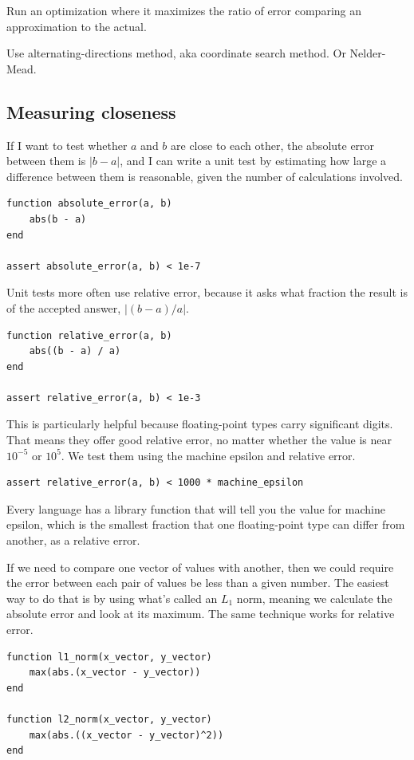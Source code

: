 \documentclass[fleqn,10pt]{olplainarticle}
\begin{document}
Run an optimization where it maximizes the ratio of error comparing an approximation to the actual.

Use alternating-directions method, aka coordinate search method. Or Nelder-Mead.

\subsection{Measuring closeness}

If I want to test whether $a$ and $b$ are close to each other,
the absolute error between them is $|b-a|$, and I can write a unit
test by estimating how large a difference between them is reasonable,
given the number of calculations involved.
\begin{lstlisting}
function absolute_error(a, b)
    abs(b - a)
end

assert absolute_error(a, b) < 1e-7
\end{lstlisting}
Unit tests more often use relative error, because it asks what
fraction the result is of the accepted answer, $|(b - a) / a|$.
\begin{lstlisting}
function relative_error(a, b)
    abs((b - a) / a)
end

assert relative_error(a, b) < 1e-3
\end{lstlisting}
This is particularly helpful because floating-point types carry
significant digits. That means they offer good relative error,
no matter whether the value is near $10^{-5}$ or $10^5$. We test
them using the machine epsilon and relative error.
\begin{lstlisting}
assert relative_error(a, b) < 1000 * machine_epsilon
\end{lstlisting}
Every language has a library function that will tell you the
value for machine epsilon, which is the smallest fraction that
one floating-point type can differ from another, as a relative
error.

If we need to compare one vector of values with another, then
we could require the error between each pair of values be less
than a given number. The easiest way to do that is by using
what's called an $L_1$ norm, meaning we calculate the absolute error and
look at its maximum. The same technique works for relative error.
\begin{lstlisting}
function l1_norm(x_vector, y_vector)
    max(abs.(x_vector - y_vector))
end

function l2_norm(x_vector, y_vector)
    max(abs.((x_vector - y_vector)^2))
end
\end{lstlisting}
\end{document}
